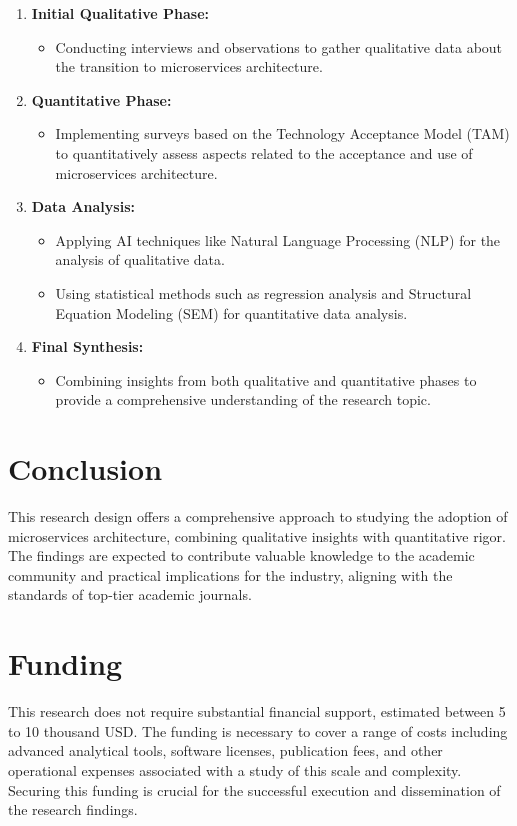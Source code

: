 \documentclass{article}
\begin{document}
\begin{enumerate}
    \item \textbf{Initial Qualitative Phase:}
    \begin{itemize}
        \item Conducting interviews and observations to gather qualitative data about the transition to microservices architecture.
    \end{itemize}
    
    \item \textbf{Quantitative Phase:}
    \begin{itemize}
        \item Implementing surveys based on the Technology Acceptance Model (TAM) to quantitatively assess aspects related to the acceptance and use of microservices architecture.
    \end{itemize}
    
    \item \textbf{Data Analysis:}
    \begin{itemize}
        \item Applying AI techniques like Natural Language Processing (NLP) for the analysis of qualitative data.
        \item Using statistical methods such as regression analysis and Structural Equation Modeling (SEM) for quantitative data analysis.
    \end{itemize}
    
    \item \textbf{Final Synthesis:}
    \begin{itemize}
        \item Combining insights from both qualitative and quantitative phases to provide a comprehensive understanding of the research topic.
    \end{itemize}
\end{enumerate}

\section{Conclusion}
\label{sec:conclusion}

This research design offers a comprehensive approach to studying the adoption of microservices architecture, combining qualitative insights with quantitative rigor. The findings are expected to contribute valuable knowledge to the academic community and practical implications for the industry, aligning with the standards of top-tier academic journals.

\section{Funding}
\label{sec:funding}

This research does not require substantial financial support, estimated between 5 to 10 thousand USD. The funding is necessary to cover a range of costs including advanced analytical tools, software licenses, publication fees, and other operational expenses associated with a study of this scale and complexity. Securing this funding is crucial for the successful execution and dissemination of the research findings.
\end{document}
